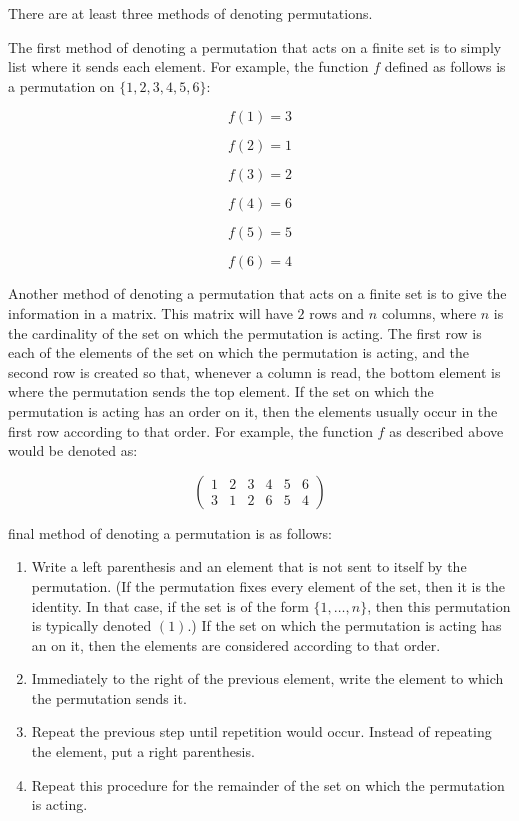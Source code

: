 \documentclass[12pt]{article}
\begin{document}

There are at least three methods of denoting permutations.

The first method of denoting a permutation that acts on a finite set is to simply list where it sends each element.  For example, the function $f$ defined as follows is a permutation on $\{ 1,2,3,4,5,6 \}$:

$$f(1)=3$$

$$f(2)=1$$

$$f(3)=2$$

$$f(4)=6$$

$$f(5)=5$$

$$f(6)=4$$

Another method of denoting a permutation that acts on a finite set is to give the information in a matrix.  This matrix will have $2$ rows and $n$ columns, where $n$ is the cardinality of the set on which the permutation is acting.  The first row is each of the elements of the set on which the permutation is acting, and the second row is created so that, whenever a column is read, the bottom element is where the permutation sends the top element.  If the set on which the permutation is acting has an order on it, then the elements usually occur in the first row according to that order.  For example, the function $f$ as described above would be denoted as:

$$\left( \begin{array}{cccccc}
1 & 2 & 3 & 4 & 5 & 6 \\
3 & 1 & 2 & 6 & 5 & 4 \end{array} \right)$$

 final method of denoting a permutation is as follows:

\begin{enumerate}
\item Write a left parenthesis and an element that is not sent to itself by the permutation.  (If the permutation fixes every element of the set, then it is the identity.  In that case, if the set is of the form $\{1, \dots , n \}$, then this permutation is typically denoted $(1)$.)  If the set on which the permutation is acting has an  on it, then the elements are considered according to that order.
\item Immediately to the right of the previous element, write the element to which the permutation sends it.
\item Repeat the previous step until repetition would occur.  Instead of repeating the element, put a right parenthesis.
\item Repeat this procedure for the remainder of the set on which the permutation is acting.
\end{enumerate}
\end{document}
